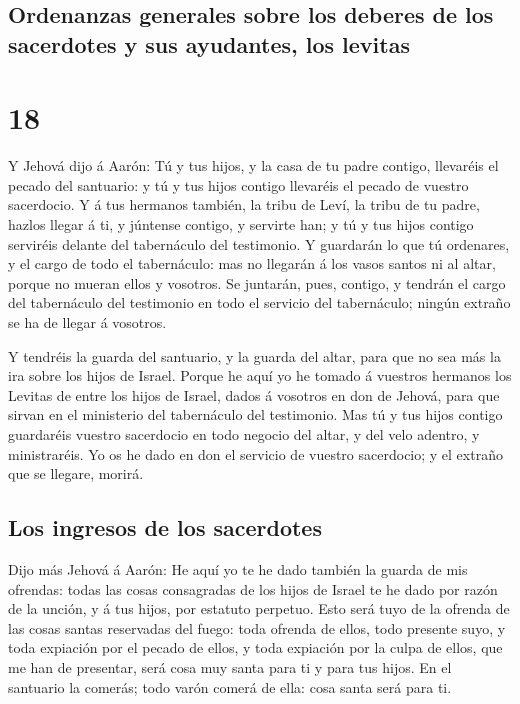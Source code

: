 \hypertarget{ordenanzas-generales-sobre-los-deberes-de-los-sacerdotes-y-sus-ayudantes-los-levitas}{%
\subsection{Ordenanzas generales sobre los deberes de los sacerdotes y
sus ayudantes, los
levitas}\label{ordenanzas-generales-sobre-los-deberes-de-los-sacerdotes-y-sus-ayudantes-los-levitas}}

\hypertarget{section-17}{%
\section{18}\label{section-17}}

 Y Jehová dijo á Aarón: Tú y tus hijos, y la casa de tu
padre contigo, llevaréis el pecado del santuario: y tú y tus hijos
contigo llevaréis el pecado de vuestro sacerdocio.  Y á
tus hermanos también, la tribu de Leví, la tribu de tu padre, hazlos
llegar á ti, y júntense contigo, y servirte han; y tú y tus hijos
contigo serviréis delante del tabernáculo del testimonio. 
Y guardarán lo que tú ordenares, y el cargo de todo el tabernáculo: mas
no llegarán á los vasos santos ni al altar, porque no mueran ellos y
vosotros.  Se juntarán, pues, contigo, y tendrán el cargo
del tabernáculo del testimonio en todo el servicio del tabernáculo;
ningún extraño se ha de llegar á vosotros.

 Y tendréis la guarda del santuario, y la guarda del
altar, para que no sea más la ira sobre los hijos de Israel.
 Porque he aquí yo he tomado á vuestros hermanos los
Levitas de entre los hijos de Israel, dados á vosotros en don de Jehová,
para que sirvan en el ministerio del tabernáculo del testimonio.
 Mas tú y tus hijos contigo guardaréis vuestro sacerdocio
en todo negocio del altar, y del velo adentro, y ministraréis. Yo os he
dado en don el servicio de vuestro sacerdocio; y el extraño que se
llegare, morirá.

\hypertarget{los-ingresos-de-los-sacerdotes}{%
\subsection{Los ingresos de los
sacerdotes}\label{los-ingresos-de-los-sacerdotes}}

 Dijo más Jehová á Aarón: He aquí yo te he dado también la
guarda de mis ofrendas: todas las cosas consagradas de los hijos de
Israel te he dado por razón de la unción, y á tus hijos, por estatuto
perpetuo.  Esto será tuyo de la ofrenda de las cosas
santas reservadas del fuego: toda ofrenda de ellos, todo presente suyo,
y toda expiación por el pecado de ellos, y toda expiación por la culpa
de ellos, que me han de presentar, será cosa muy santa para ti y para
tus hijos.  En el santuario la comerás; todo varón comerá
de ella: cosa santa será para ti.

